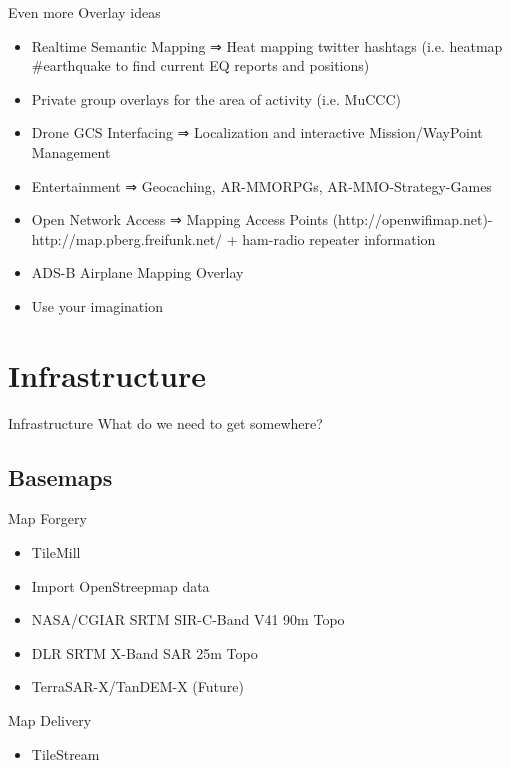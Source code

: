 \documentclass{beamer}
\begin{document}
\begin{frame}{Even more Overlay ideas}{}
 \vspace{1em}
 \begin{itemize}
  \item Realtime Semantic Mapping ⇒ Heat mapping twitter hashtags (i.e. heatmap \#earthquake to find current EQ reports and positions)
  \item Private group overlays for the area of activity (i.e. MuCCC)
  \item Drone GCS Interfacing ⇒ Localization and interactive Mission/WayPoint Management
  \item Entertainment ⇒ Geocaching, AR-MMORPGs, AR-MMO-Strategy-Games
  \item Open Network Access ⇒ Mapping Access Points (http://openwifimap.net)-http://map.pberg.freifunk.net/ + ham-radio repeater information
  \item ADS-B Airplane Mapping Overlay
  \item Use your imagination
 \end{itemize}
\end{frame}


\section{Infrastructure}

\begin{frame}{Infrastructure}
What do we need to get somewhere?
\end{frame}

\subsection{Basemaps}

\begin{frame}{Map Forgery}

\begin{itemize}
  \item TileMill
  \item Import OpenStreepmap data
  \item NASA/CGIAR SRTM SIR-C-Band V41 90m Topo
  \item DLR SRTM X-Band SAR 25m Topo
  \item TerraSAR-X/TanDEM-X (Future)
\end{itemize}

\end{frame}

\begin{frame}{Map Delivery}

\begin{itemize}
  \item TileStream
\end{itemize}

\end{frame}
\end{document}
